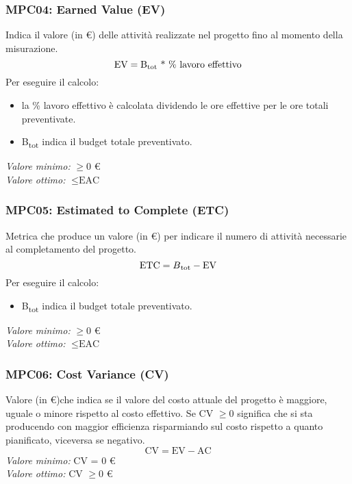 \subsubsection{MPC04: Earned Value (EV)}
Indica il valore (in \euro) delle attività realizzate nel progetto fino al momento della misurazione.
\begin{equation*}
\text{EV}=\text{B\textsubscript{tot} * \%\text{ lavoro effettivo}}
\end{equation*}
\noindent Per eseguire il calcolo:
\begin{itemize}
\item la \% lavoro effettivo è calcolata dividendo le ore effettive per le ore totali preventivate.
\item B\textsubscript{tot} indica il budget totale preventivato.
\end{itemize}
\textit{Valore minimo:} $\ge 0$ \euro\\
\textit{Valore ottimo:} $\le \text{EAC}$
\subsubsection{MPC05: Estimated to Complete (ETC)}
Metrica che produce un valore (in \euro) per indicare il numero di attività necessarie al completamento del progetto.\\
\begin{equation*}
\text{ETC}=B\textsubscript{tot}-\text{EV}
\end{equation*}
\noindent Per eseguire il calcolo:
\begin{itemize}
\item B\textsubscript{tot} indica il budget totale preventivato.
\end{itemize}
\textit{Valore minimo:} $\ge 0$ \euro\\
\textit{Valore ottimo:} $\le \text{EAC}$
\subsubsection{MPC06: Cost Variance (CV)}
Valore (in \euro)che indica se il valore del costo attuale del progetto è maggiore, uguale o minore rispetto al costo effettivo. Se CV $\ge 0$ significa che si sta producendo con maggior efficienza risparmiando sul costo rispetto a quanto pianificato, viceversa se negativo.
\begin{equation*}
\text{CV}=\text{EV}-\text{AC}
\end{equation*}
\textit{Valore minimo:} CV = 0 \euro\\
\textit{Valore ottimo:} CV $\ge 0$ \euro
